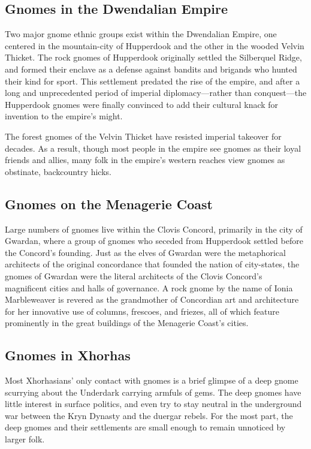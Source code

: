 \documentclass[10pt,a4paper,twoside,bg=print,twocolumn,openany,nodeprecatedcode]{dndbook}
\begin{document}
\subsection{Gnomes in the Dwendalian Empire}
Two major gnome ethnic groups exist within the Dwendalian Empire, one centered in the mountain-city of Hupperdook and the other in the wooded Velvin Thicket. The rock gnomes of Hupperdook originally settled the Silberquel Ridge, and formed their enclave as a defense against bandits and brigands who hunted their kind for sport. This settlement predated the rise of the empire, and after a long and unprecedented period of imperial diplomacy—rather than conquest—the Hupperdook gnomes were finally convinced to add their cultural knack for invention to the empire's might.

The forest gnomes of the Velvin Thicket have resisted imperial takeover for decades. As a result, though most people in the empire see gnomes as their loyal friends and allies, many folk in the empire's western reaches view gnomes as obstinate, backcountry hicks.

\subsection{Gnomes on the Menagerie Coast}
Large numbers of gnomes live within the Clovis Concord, primarily in the city of Gwardan, where a group of gnomes who seceded from Hupperdook settled before the Concord's founding. Just as the elves of Gwardan were the metaphorical architects of the original concordance that founded the nation of city-states, the gnomes of Gwardan were the literal architects of the Clovis Concord's magnificent cities and halls of governance. A rock gnome by the name of Ionia Marbleweaver is revered as the grandmother of Concordian art and architecture for her innovative use of columns, frescoes, and friezes, all of which feature prominently in the great buildings of the Menagerie Coast's cities.

\subsection{Gnomes in Xhorhas}
Most Xhorhasians' only contact with gnomes is a brief glimpse of a deep gnome scurrying about the Underdark carrying armfuls of gems. The deep gnomes have little interest in surface politics, and even try to stay neutral in the underground war between the Kryn Dynasty and the duergar rebels. For the most part, the deep gnomes and their settlements are small enough to remain unnoticed by larger folk.
\end{document}
